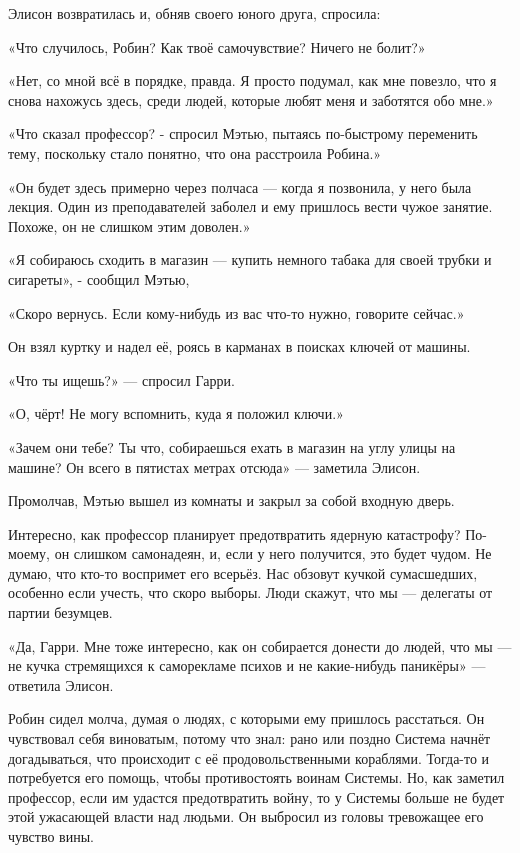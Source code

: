 \documentclass[a5paper, 9pt,
final, openany, twoside=true]{memoir}
\begin{document}
Элисон возвратилась и, обняв своего юного друга, спросила:

«Что случилось, Робин? Как твоё самочувствие? Ничего не болит?»

«Нет, со мной всё в порядке, правда. Я просто подумал, как мне повезло, что я снова нахожусь здесь, среди людей, которые любят меня и заботятся обо мне.»

«Что сказал профессор? - спросил Мэтью, пытаясь по-быстрому переменить тему, поскольку стало понятно, что она расстроила Робина.»

«Он будет здесь примерно через полчаса — когда я позвонила, у него была лекция. Один из преподавателей заболел и ему пришлось вести чужое занятие. Похоже, он не слишком этим доволен.»

«Я собираюсь сходить в магазин — купить немного табака для своей трубки и сигареты», - сообщил Мэтью,

«Скоро вернусь. Если кому-нибудь из вас что-то нужно, говорите сейчас.»

Он взял куртку и надел её, роясь в карманах в поисках ключей от машины.

«Что ты ищешь?» — спросил Гарри.

«О, чёрт! Не могу вспомнить, куда я положил ключи.»

«Зачем они тебе? Ты что, собираешься ехать в магазин на углу улицы на машине? Он всего в пятистах метрах отсюда» — заметила Элисон.

Промолчав, Мэтью вышел из комнаты и закрыл за собой входную дверь.

Интересно, как профессор планирует предотвратить ядерную катастрофу? По-моему, он слишком самонадеян, и, если у него получится, это будет чудом. Не думаю, что кто-то воспримет его всерьёз. Нас обзовут кучкой сумасшедших, особенно если учесть, что скоро выборы. Люди скажут, что мы — делегаты от партии безумцев.

«Да, Гарри. Мне тоже интересно, как он собирается донести до людей, что мы — не кучка стремящихся к саморекламе психов и не какие-нибудь паникёры» — ответила Элисон.

Робин сидел молча, думая о людях, с которыми ему пришлось расстаться. Он чувствовал себя виноватым, потому что знал: рано или поздно Система начнёт догадываться, что происходит с её продовольственными кораблями. Тогда-то и потребуется его помощь, чтобы противостоять воинам Системы. Но, как заметил профессор, если им удастся предотвратить войну, то у Системы больше не будет этой ужасающей власти над людьми. Он выбросил из головы тревожащее его чувство вины.\bigskip
\end{document}
